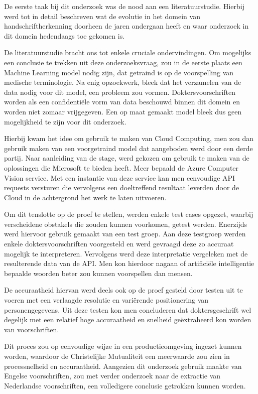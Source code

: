 De eerste taak bij dit onderzoek was de nood aan een literatuurstudie. Hierbij werd tot in detail beschreven wat de evolutie in het domein van handschriftherkenning doorheen de jaren ondergaan heeft en waar onderzoek in dit domein hedendaags toe gekomen is. 



De literatuurstudie bracht ons tot enkele cruciale ondervindingen. Om mogelijks een conclusie te trekken uit deze onderzoeksvraag, zou in de eerste plaats een Machine Learning model nodig zijn, dat getraind is op de voorspelling van medische terminologie. Na enig opzoekwerk, bleek dat het verzamelen van de data nodig voor dit model, een probleem zou vormen. Doktersvoorschriften worden als een confidentiële vorm van data beschouwd binnen dit domein en worden niet zomaar vrijgegeven. Een op maat gemaakt model bleek dus geen mogelijkheid te zijn voor dit onderzoek.  



Hierbij kwam het idee om gebruik te maken van Cloud Computing, men zou dan gebruik maken van een voorgetraind model dat aangeboden werd door een derde partij. Naar aanleiding van de stage, werd gekozen om gebruik te maken van de oplossingen die Microsoft te bieden heeft. Meer bepaald de Azure Computer Vision service. Met een instantie van deze service kan men eenvoudige API requests versturen die vervolgens een doeltreffend resultaat leverden door de Cloud in de achtergrond het werk te laten uitvoeren.  



Om dit tenslotte op de proef te stellen, werden enkele test cases opgezet, waarbij verscheidene obstakels die zouden kunnen voorkomen, getest werden. Enerzijds werd hiervoor gebruik gemaakt van een test groep. Aan deze testgroep werden enkele doktersvoorschriften voorgesteld en werd gevraagd deze zo accuraat mogelijk te interpreteren. Vervolgens werd deze interpretatie vergeleken met de resulterende data van de API. Men kon hierdoor nagaan of artificiële intelligentie bepaalde woorden beter zou kunnen voorspellen dan mensen. 



De accuraatheid hiervan werd deels ook op de proef gesteld door testen uit te voeren met een verlaagde resolutie en variërende positionering van personengegevens. Uit deze testen kon men concluderen dat doktersgeschrift wel degelijk met een relatief hoge accuraatheid en snelheid geëxtraheerd kon worden van voorschriften.  



Dit proces zou op eenvoudige wijze in een productieomgeving ingezet kunnen worden, waardoor de Christelijke Mutualiteit een meerwaarde zou zien in processnelheid en accuraatheid. Aangezien dit onderzoek gebruik maakte van Engelse voorschriften, zou met verder onderzoek naar de extractie van Nederlandse voorschriften, een volledigere conclusie getrokken kunnen worden. 
